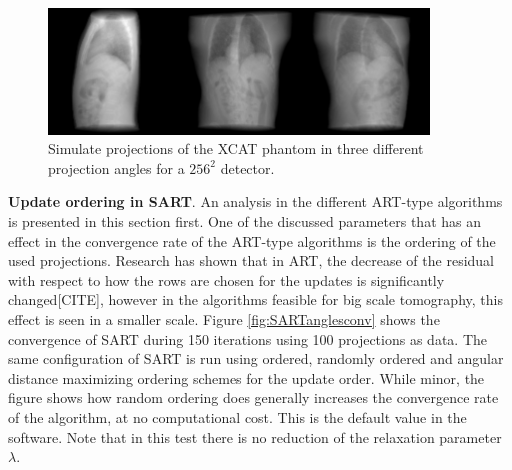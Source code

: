 \begin{figure}[h]
\begin{center}

\includegraphics[width=0.9\textwidth]{Applications/XCATproj.png} 
\end{center}

\caption[Simulate projections of the XCAT phantom]{\label{fig:XCATproj} Simulate projections of the XCAT phantom in three different projection angles for a $256^2$ detector.} 
\end{figure}

\textbf{Update ordering in SART}. An analysis in the different ART-type algorithms is presented in this section first. One of the discussed parameters that has an effect in the convergence rate of the ART-type algorithms is the ordering of the used projections. Research has shown that in ART, the decrease of the residual with respect to how the rows are chosen for the updates is significantly changed[CITE], however in the algorithms feasible for big scale tomography, this effect is seen in a smaller scale. Figure \ref{fig:SARTanglesconv} shows the convergence of SART during 150 iterations using 100 projections as data. The same configuration of SART is run using ordered, randomly ordered and angular distance maximizing ordering schemes for the update order. While minor, the figure shows how random ordering does generally increases the convergence rate of the algorithm, at no computational cost. This is the default value in the software. Note that in this test there is no reduction of the relaxation parameter $\lambda$.


